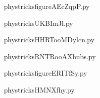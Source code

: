     \newcommand{\CaptionFigfigureAEcZqpP}{<+Type your caption here+>}
    \begin{center}
        
    \end{center}
    phystricksfigureAEcZqpP.py

    

    \clearpage
    


    \newcommand{\CaptionFigUKBImJl}{<+Type your caption here+>}
    \begin{center}
        
    \end{center}
    phystricksUKBImJl.py

    

    \clearpage
    


    \newcommand{\CaptionFigHHRTooMDylcn}{<+Type your caption here+>}
    \begin{center}
        
    \end{center}
    phystricksHHRTooMDylcn.py

    

    \clearpage
    


    \newcommand{\CaptionFigRNTRooAXhubs}{<+Type your caption here+>}
    \begin{center}
        
    \end{center}
    phystricksRNTRooAXhubs.py

    

    \clearpage
    


    \newcommand{\CaptionFigfigureERITfSy}{<+Type your caption here+>}
    \begin{center}
        
    \end{center}
    phystricksfigureERITfSy.py

    

    \clearpage
    


    \newcommand{\CaptionFigHMNXfhy}{<+Type your caption here+>}
    \begin{center}
        
    \end{center}
    phystricksHMNXfhy.py

